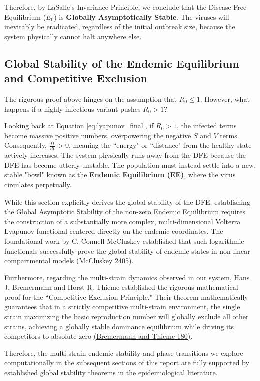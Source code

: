 \documentclass[12pt]{article}
\begin{document}
Therefore, by LaSalle's Invariance Principle, we conclude that the Disease-Free Equilibrium ($E_0$) is \textbf{Globally Asymptotically Stable}. The viruses will inevitably be eradicated, regardless of the initial outbreak size, because the system physically cannot halt anywhere else.

\subsection{Global Stability of the Endemic Equilibrium and Competitive Exclusion}
The rigorous proof above hinges on the assumption that $R_0 \le 1$. However, what happens if a highly infectious variant pushes $R_0 > 1$? 

Looking back at Equation \ref{eq:lyapunov_final}, if $R_0 > 1$, the infected terms become massive positive numbers, overpowering the negative $S$ and $V$ terms. Consequently, $\frac{dL}{dt} > 0$, meaning the ``energy" or ``distance" from the healthy state actively increases. The system physically runs away from the DFE because the DFE has become utterly unstable. The population must instead settle into a new, stable "bowl" known as the \textbf{Endemic Equilibrium (EE)}, where the virus circulates perpetually.

While this section explicitly derives the global stability of the DFE, establishing the Global Asymptotic Stability of the non-zero Endemic Equilibrium requires the construction of a substantially more complex, multi-dimensional Volterra Lyapunov functional centered directly on the endemic coordinates. The foundational work by C. Connell McCluskey established that such logarithmic functionals successfully prove the global stability of endemic states in non-linear compartmental models \hyperref[mccluskey2010]{(McCluskey 2405)}. 

Furthermore, regarding the multi-strain dynamics observed in our system, Hans J. Bremermann and Horst R. Thieme established the rigorous mathematical proof for the ``Competitive Exclusion Principle." Their theorem mathematically guarantees that in a strictly competitive multi-strain environment, the single strain maximizing the basic reproduction number will globally exclude all other strains, achieving a globally stable dominance equilibrium while driving its competitors to absolute zero \hyperref[bremermann1989]{(Bremermann and Thieme 180)}. 

Therefore, the multi-strain endemic stability and phase transitions we explore computationally in the subsequent sections of this report are fully supported by established global stability theorems in the epidemiological literature.
\end{document}
